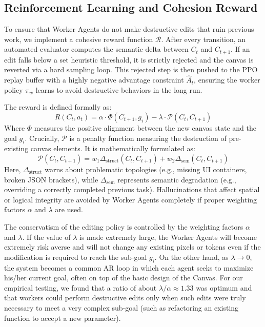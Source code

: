 \documentclass[pdflatex,sn-mathphys-num]{sn-jnl}
\begin{document}
\subsection{Reinforcement Learning and Cohesion Reward}
To ensure that Worker Agents do not make destructive edits that ruin previous work, we implement a cohesive reward function $\mathcal{R}$. After every transition, an automated evaluator computes the semantic delta between $C_t$ and $C_{t+1}$. If an edit falls below a set heuristic threshold, it is strictly rejected and the canvas is reverted via a hard sampling loop. This rejected step is then pushed to the PPO replay buffer with a highly negative advantage constraint $\hat{A}_t$, ensuring the worker policy $\pi_w$ learns to avoid destructive behaviors in the long run.

The reward is defined formally as:
\begin{equation}
    R(C_t, a_t) = \alpha \cdot \Phi(C_{t+1}, g_i) - \lambda \cdot \mathcal{P}(C_{t}, C_{t+1})
\end{equation}
Where $\Phi$ measures the positive alignment between the new canvas state and the goal $g_i$. Crucially, $\mathcal{P}$ is a penalty function measuring the destruction of pre-existing canvas elements. It is mathematically formulated as:
\begin{equation}
    \mathcal{P}(C_t, C_{t+1}) = w_1 \Delta_{\mathrm{struct}}(C_t, C_{t+1}) + w_2 \Delta_{\mathrm{sem}}(C_t, C_{t+1})
\end{equation}
Here, $\Delta_{\mathrm{struct}}$ warns about problematic topologies (e.g., missing UI containers, broken JSON brackets), while $\Delta_{\mathrm{sem}}$ represents semantic degradation (e.g., overriding a correctly completed previous task). Hallucinations that affect spatial or logical integrity are avoided by Worker Agents completely if proper weighting factors $\alpha$ and $\lambda$ are used.

The conservatism of the editing policy is controlled by the weighting factors $\alpha$ and $\lambda$. If the value of $\lambda$ is made extremely large, the Worker Agents will become extremely risk averse and will not change any existing pixels or tokens even if the modification is required to reach the sub-goal $g_i$. On the other hand, as $\lambda \rightarrow 0$, the system becomes a common AR loop in which each agent seeks to maximize his/her current goal, often on top of the basic design of the Canvas. For our empirical testing, we found that a ratio of about $\lambda/\alpha \approx 1.33$ was optimum and that workers could perform destructive edits only when such edits were truly necessary to meet a very complex sub-goal (such as refactoring an existing function to accept a new parameter).
\end{document}
